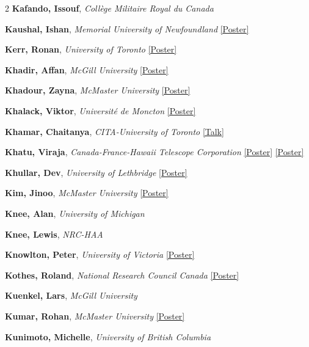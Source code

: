 \begin{small}
\begin{multicols}{2}
\textbf{Kafando, Issouf}, {\footnotesize\textit{Collège Militaire Royal du Canada}}\par
\textbf{Kaushal, Ishan}, {\footnotesize\textit{Memorial University of Newfoundland}} \hyperref[poster-abstract-page-talk-276]{\scriptsize\textcolor{cascateal}{[Poster]}}\par
\textbf{Kerr, Ronan}, {\footnotesize\textit{University of Toronto}} \hyperref[poster-abstract-page-talk-58]{\scriptsize\textcolor{cascateal}{[Poster]}}\par
\textbf{Khadir, Affan}, {\footnotesize\textit{McGill University}} \hyperref[poster-abstract-page-talk-98]{\scriptsize\textcolor{cascateal}{[Poster]}}\par
\textbf{Khadour, Zayna}, {\footnotesize\textit{McMaster University}} \hyperref[poster-abstract-page-talk-39]{\scriptsize\textcolor{cascateal}{[Poster]}}\par
\textbf{Khalack, Viktor}, {\footnotesize\textit{Université de Moncton}} \hyperref[poster-abstract-page-talk-81]{\scriptsize\textcolor{cascateal}{[Poster]}}\par
\textbf{Khamar, Chaitanya}, {\footnotesize\textit{CITA-University of Toronto}} \hyperref[abstract-page-talk-307]{\scriptsize\textcolor{cascablue}{[Talk]}}\par
\textbf{Khatu, Viraja}, {\footnotesize\textit{Canada-France-Hawaii Telescope Corporation}} \hyperref[poster-abstract-page-talk-295]{\scriptsize\textcolor{cascateal}{[Poster]}} \hyperref[poster-abstract-page-talk-325]{\scriptsize\textcolor{cascateal}{[Poster]}}\par
\textbf{Khullar, Dev}, {\footnotesize\textit{University of Lethbridge}} \hyperref[poster-abstract-page-talk-107]{\scriptsize\textcolor{cascateal}{[Poster]}}\par
\textbf{Kim, Jinoo}, {\footnotesize\textit{McMaster University}} \hyperref[poster-abstract-page-talk-130]{\scriptsize\textcolor{cascateal}{[Poster]}}\par
\textbf{Knee, Alan}, {\footnotesize\textit{University of Michigan}}\par
\textbf{Knee, Lewis}, {\footnotesize\textit{NRC-HAA}}\par
\textbf{Knowlton, Peter}, {\footnotesize\textit{University of Victoria}} \hyperref[poster-abstract-page-talk-271]{\scriptsize\textcolor{cascateal}{[Poster]}}\par
\textbf{Kothes, Roland}, {\footnotesize\textit{National Research Council Canada}} \hyperref[poster-abstract-page-talk-318]{\scriptsize\textcolor{cascateal}{[Poster]}}\par
\textbf{Kuenkel, Lars}, {\footnotesize\textit{McGill University}}\par
\textbf{Kumar, Rohan}, {\footnotesize\textit{McMaster University}} \hyperref[poster-abstract-page-talk-102]{\scriptsize\textcolor{cascateal}{[Poster]}}\par
\textbf{Kunimoto, Michelle}, {\footnotesize\textit{University of British Columbia}}\par


\end{multicols}
\end{small}
